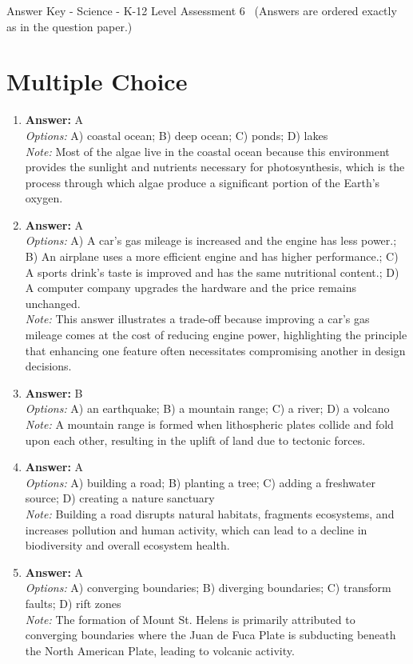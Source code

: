 \documentclass[12pt]{article}
\begin{document}
\begin{center}
Answer Key - Science - K-12 Level Assessment 6 \
\small (Answers are ordered exactly as in the question paper.)
\end{center}

\section*{Multiple Choice}
\begin{enumerate}[label=\arabic*.]
\item \textbf{Answer:} A
\\ \textit{Options:} A) coastal ocean; B) deep ocean; C) ponds; D) lakes
\\ \textit{Note:} Most of the algae live in the coastal ocean because this environment provides the sunlight and nutrients necessary for photosynthesis, which is the process through which algae produce a significant portion of the Earth's oxygen.
\item \textbf{Answer:} A
\\ \textit{Options:} A) A car's gas mileage is increased and the engine has less power.; B) An airplane uses a more efficient engine and has higher performance.; C) A sports drink's taste is improved and has the same nutritional content.; D) A computer company upgrades the hardware and the price remains unchanged.
\\ \textit{Note:} This answer illustrates a trade-off because improving a car's gas mileage comes at the cost of reducing engine power, highlighting the principle that enhancing one feature often necessitates compromising another in design decisions.
\item \textbf{Answer:} B
\\ \textit{Options:} A) an earthquake; B) a mountain range; C) a river; D) a volcano
\\ \textit{Note:} A mountain range is formed when lithospheric plates collide and fold upon each other, resulting in the uplift of land due to tectonic forces.
\item \textbf{Answer:} A
\\ \textit{Options:} A) building a road; B) planting a tree; C) adding a freshwater source; D) creating a nature sanctuary
\\ \textit{Note:} Building a road disrupts natural habitats, fragments ecosystems, and increases pollution and human activity, which can lead to a decline in biodiversity and overall ecosystem health.
\item \textbf{Answer:} A
\\ \textit{Options:} A) converging boundaries; B) diverging boundaries; C) transform faults; D) rift zones
\\ \textit{Note:} The formation of Mount St. Helens is primarily attributed to converging boundaries where the Juan de Fuca Plate is subducting beneath the North American Plate, leading to volcanic activity.
\end{enumerate}
\end{document}
